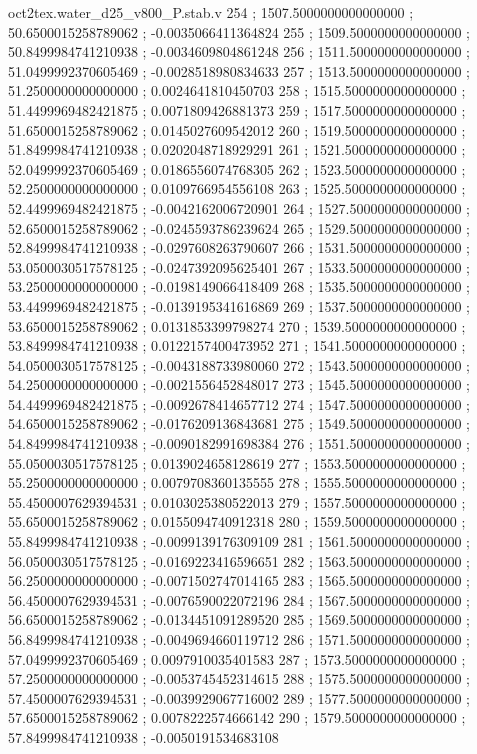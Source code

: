 \begin{filecontents}[overwrite]{oct2tex.water_d25_v800_P.stab.v}
254 ; 1507.5000000000000000 ; 50.6500015258789062 ; -0.0035066411364824
255 ; 1509.5000000000000000 ; 50.8499984741210938 ; -0.0034609804861248
256 ; 1511.5000000000000000 ; 51.0499992370605469 ; -0.0028518980834633
257 ; 1513.5000000000000000 ; 51.2500000000000000 ; 0.0024641810450703
258 ; 1515.5000000000000000 ; 51.4499969482421875 ; 0.0071809426881373
259 ; 1517.5000000000000000 ; 51.6500015258789062 ; 0.0145027609542012
260 ; 1519.5000000000000000 ; 51.8499984741210938 ; 0.0202048718929291
261 ; 1521.5000000000000000 ; 52.0499992370605469 ; 0.0186556074768305
262 ; 1523.5000000000000000 ; 52.2500000000000000 ; 0.0109766954556108
263 ; 1525.5000000000000000 ; 52.4499969482421875 ; -0.0042162006720901
264 ; 1527.5000000000000000 ; 52.6500015258789062 ; -0.0245593786239624
265 ; 1529.5000000000000000 ; 52.8499984741210938 ; -0.0297608263790607
266 ; 1531.5000000000000000 ; 53.0500030517578125 ; -0.0247392095625401
267 ; 1533.5000000000000000 ; 53.2500000000000000 ; -0.0198149066418409
268 ; 1535.5000000000000000 ; 53.4499969482421875 ; -0.0139195341616869
269 ; 1537.5000000000000000 ; 53.6500015258789062 ; 0.0131853399798274
270 ; 1539.5000000000000000 ; 53.8499984741210938 ; 0.0122157400473952
271 ; 1541.5000000000000000 ; 54.0500030517578125 ; -0.0043188733980060
272 ; 1543.5000000000000000 ; 54.2500000000000000 ; -0.0021556452848017
273 ; 1545.5000000000000000 ; 54.4499969482421875 ; -0.0092678414657712
274 ; 1547.5000000000000000 ; 54.6500015258789062 ; -0.0176209136843681
275 ; 1549.5000000000000000 ; 54.8499984741210938 ; -0.0090182991698384
276 ; 1551.5000000000000000 ; 55.0500030517578125 ; 0.0139024658128619
277 ; 1553.5000000000000000 ; 55.2500000000000000 ; 0.0079708360135555
278 ; 1555.5000000000000000 ; 55.4500007629394531 ; 0.0103025380522013
279 ; 1557.5000000000000000 ; 55.6500015258789062 ; 0.0155094740912318
280 ; 1559.5000000000000000 ; 55.8499984741210938 ; -0.0099139176309109
281 ; 1561.5000000000000000 ; 56.0500030517578125 ; -0.0169223416596651
282 ; 1563.5000000000000000 ; 56.2500000000000000 ; -0.0071502747014165
283 ; 1565.5000000000000000 ; 56.4500007629394531 ; -0.0076590022072196
284 ; 1567.5000000000000000 ; 56.6500015258789062 ; -0.0134451091289520
285 ; 1569.5000000000000000 ; 56.8499984741210938 ; -0.0049694660119712
286 ; 1571.5000000000000000 ; 57.0499992370605469 ; 0.0097910035401583
287 ; 1573.5000000000000000 ; 57.2500000000000000 ; -0.0053745452314615
288 ; 1575.5000000000000000 ; 57.4500007629394531 ; -0.0039929067716002
289 ; 1577.5000000000000000 ; 57.6500015258789062 ; 0.0078222574666142
290 ; 1579.5000000000000000 ; 57.8499984741210938 ; -0.0050191534683108

\end{filecontents}
